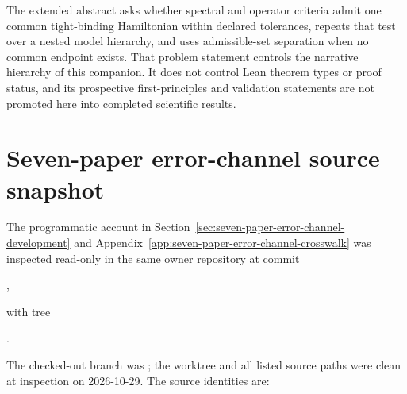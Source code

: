 The extended abstract asks whether spectral and operator criteria admit one common
tight-binding Hamiltonian within declared tolerances, repeats that test over a nested
model hierarchy, and uses admissible-set separation when no common endpoint exists.
That problem statement controls the narrative hierarchy of this companion.  It does not
control Lean theorem types or proof status, and its prospective first-principles and
validation statements are not promoted here into completed scientific results.

\section{Seven-paper error-channel source snapshot}
\label{sec:seven-paper-source-snapshot}

The programmatic account in
Section~\ref{sec:seven-paper-error-channel-development} and
Appendix~\ref{app:seven-paper-error-channel-crosswalk} was inspected read-only in the
same owner repository at commit

\begin{center}
,
\end{center}

with tree

\begin{center}
.
\end{center}

The checked-out branch was ; the worktree and all
listed source paths were clean at inspection on 2026-10-29.  The source identities are:

